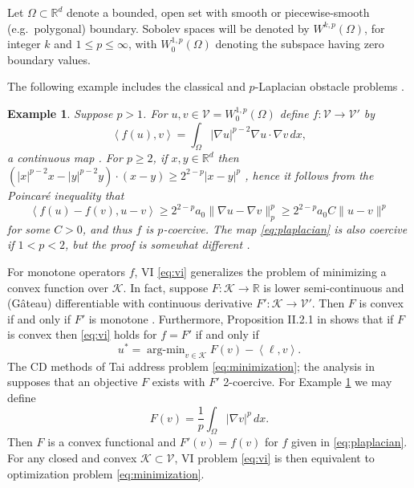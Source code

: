 \documentclass[letterpaper,final,12pt,reqno]{amsart}
\theoremstyle{cstyle}
\theoremstyle{cstyle*}
\theoremstyle{dstyle}
\newtheorem{example}[theorem]{Example}
\numberwithin{equation}{section}
\numberwithin{figure}{section}
\numberwithin{table}{section}
\numberwithin{theorem}{section}
\newcommand{\RR}{\mathbb{R}}
\newcommand{\grad}{\nabla}
\newcommand{\cK}{\mathcal{K}}
\newcommand{\cV}{\mathcal{V}}
\newcommand{\ip}[2]{\left<#1,#2\right>}
\begin{document}
Let $\Omega \subset \RR^d$ denote a bounded, open set with smooth or piecewise-smooth (e.g.~polygonal) boundary.  Sobolev spaces \cite{Evans2010} will be denoted by $W^{k,p}(\Omega)$, for integer $k$ and $1\le p \le \infty$, with $W^{1,p}_0(\Omega)$ denoting the subspace having zero boundary values.

The following example includes the classical and $p$-Laplacian obstacle problems \cite{ChoeLewis1991}.

\begin{example}  \label{ex:plaplacian}  Suppose $p>1$.  For $u,v \in \cV = W^{1,p}_0(\Omega)$ define $f:\cV \to \cV'$ by
\begin{equation}
\ip{f(u)}{v} = \int_\Omega |\grad u|^{p-2} \grad u \cdot \grad v\,dx, \label{eq:plaplacian}
\end{equation}
a continuous map \cite[Theorem A.0.6]{Peral1997}.  For $p\ge 2$, if $x,y\in\RR^d$ then $(|x|^{p-2} x - |y|^{p-2} y)\cdot (x-y) \ge 2^{2-p} |x-y|^p$ \cite[Appendix A]{Bueler2021conservation}, hence it follows from the Poincar\'e inequality that
    $$\ip{f(u) - f(v)}{u-v} \ge 2^{2-p} a_0 \|\grad u - \grad v\|_p^p \ge 2^{2-p} a_0 C \|u-v\|^p$$
for some $C>0$, and thus $f$ is $p$-coercive.  The map \eqref{eq:plaplacian} is also coercive if $1<p<2$, but the proof is somewhat different \cite[Theorem 4.4, for example]{Bueler2021conservation}.  \end{example}

For monotone operators $f$, VI \eqref{eq:vi} generalizes the problem of minimizing a convex function over $\cK$.  In fact, suppose $F:\cK \to \RR$ is lower semi-continuous and (G\^ateau) differentiable with continuous derivative $F':\cK \to \cV'$.  Then $F$ is convex if and only if $F'$ is monotone \cite[Proposition I.5.5]{EkelandTemam1976}.  Furthermore, Proposition II.2.1 in \cite{EkelandTemam1976} shows that if $F$ is convex then \eqref{eq:vi} holds for $f=F'$ if and only if
\begin{equation}
u^* = \operatorname{arg-min}_{v\in\cK} F(v) - \ip{\ell}{v}. \label{eq:minimization}
\end{equation}
The CD methods of Tai \cite{Tai2003} address problem \eqref{eq:minimization}; the analysis in \cite{Tai2003} supposes that an objective $F$ exists with $F'$ 2-coercive.  For Example \ref{ex:plaplacian} we may define
\begin{equation}
F(v) = \frac{1}{p} \int_\Omega |\grad v|^p\,dx. \label{eq:plaplacianobjective}
\end{equation}
Then $F$ is a convex functional and $F'(v) = f(v)$ for $f$ given in \eqref{eq:plaplacian}.  For any closed and convex $\cK\subset \cV$, VI problem \eqref{eq:vi} is then equivalent to optimization problem \eqref{eq:minimization}.
\end{document}
